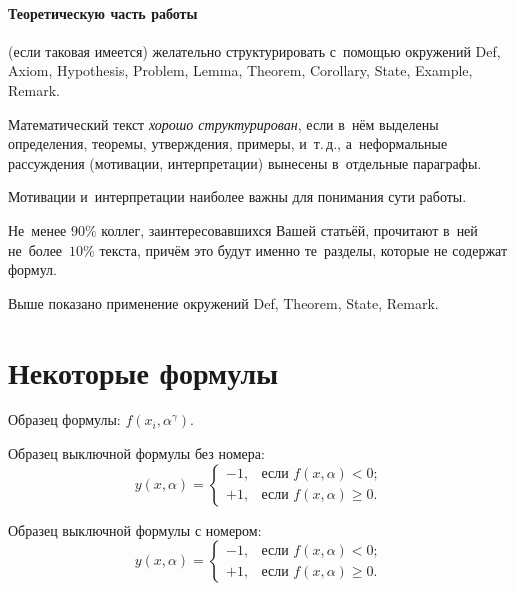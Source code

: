 \documentclass[10pt]{article}
\begin{document}
\paragraph{Теоретическую часть работы}(если таковая имеется) желательно структурировать
с~помощью окружений
Def, Axiom, Hypothesis, Problem, Lemma, Theorem, Corollary, State, Example, Remark.

\begin{Def}
    Математический текст \emph{хорошо структурирован},
    если в~нём выделены определения, теоремы, утверждения, примеры, и~т.\,д.,
    а~неформальные рассуждения (мотивации, интерпретации)
    вынесены в~отдельные параграфы.
\end{Def}

\begin{State}
    Мотивации и~интерпретации наиболее важны для понимания сути работы.
\end{State}

\begin{Theorem}
    Не~менее $90\%$ коллег, заинтересовавшихся Вашей статьёй,
    прочитают в~ней не~более~$10\%$ текста,
    причём это будут именно те~разделы, которые не содержат формул.
\end{Theorem}

\begin{Remark}
    Выше показано применение окружений
    Def, Theorem, State, Remark.
\end{Remark}

\section{Некоторые формулы}

Образец формулы: $f(x_i,\alpha^\gamma)$.

Образец выключной формулы без номера:
\[
    y(x,\alpha) =
    \begin{cases}
        -1, & \text{если } f(x,\alpha)<0;  \\
        +1, & \text{если } f(x,\alpha)\geq 0.
    \end{cases}
\]

Образец выключной формулы с номером:
\begin{equation}
\label{eq:cases}
    y(x,\alpha) =
    \begin{cases}
        -1, & \text{если } f(x,\alpha)<0;  \\
        +1, & \text{если } f(x,\alpha)\geq 0.
    \end{cases}
\end{equation}
\end{document}
